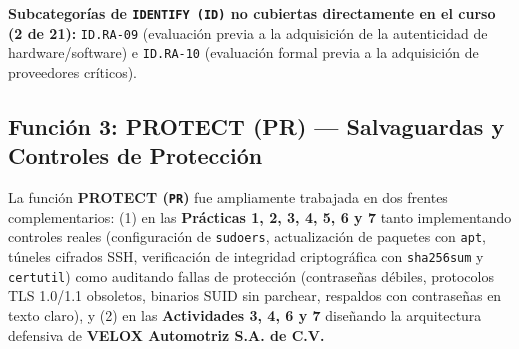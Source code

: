 \documentclass[letterpaper,11pt]{article}
\begin{document}
\noindent\textbf{Subcategorías de \texttt{IDENTIFY (ID)} no cubiertas directamente en el curso (2 de 21):} \texttt{ID.RA-09} (evaluación previa a la adquisición de la autenticidad de hardware/software) e \texttt{ID.RA-10} (evaluación formal previa a la adquisición de proveedores críticos).

\subsection{Función 3: PROTECT (PR) --- Salvaguardas y Controles de Protección}

La función \textbf{PROTECT (\texttt{PR})} fue ampliamente trabajada en dos frentes complementarios: (1) en las \textbf{Prácticas 1, 2, 3, 4, 5, 6 y 7} tanto implementando controles reales (configuración de \texttt{sudoers}, actualización de paquetes con \texttt{apt}, túneles cifrados SSH, verificación de integridad criptográfica con \texttt{sha256sum} y \texttt{certutil}) como auditando fallas de protección (contraseñas débiles, protocolos TLS 1.0/1.1 obsoletos, binarios SUID sin parchear, respaldos con contraseñas en texto claro), y (2) en las \textbf{Actividades 3, 4, 6 y 7} diseñando la arquitectura defensiva de \textbf{VELOX Automotriz S.A. de C.V.}
\end{document}
